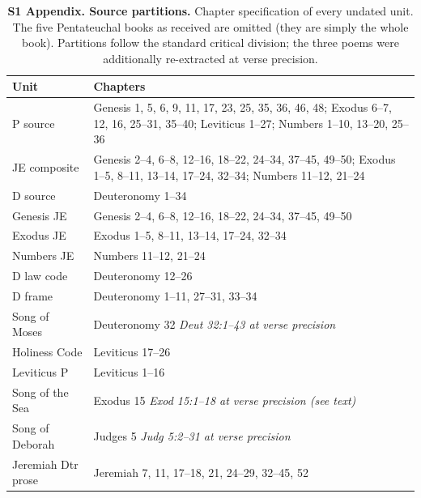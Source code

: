 \begin{table}[!ht]
\centering
\footnotesize
\caption{{\bf S1 Appendix. Source partitions.}  Chapter specification of every undated unit.  The five Pentateuchal books as received are omitted (they are simply the whole book).  Partitions follow the standard critical division; the three poems were additionally re-extracted at verse precision.}
\label{tab:s1}
\begin{tabular}{lp{9.2cm}}
\toprule
\textbf{Unit} & \textbf{Chapters} \\
\midrule
P source & Genesis 1, 5, 6, 9, 11, 17, 23, 25, 35, 36, 46, 48; Exodus 6--7, 12, 16, 25--31, 35--40; Leviticus 1--27; Numbers 1--10, 13--20, 25--36 \\
JE composite & Genesis 2--4, 6--8, 12--16, 18--22, 24--34, 37--45, 49--50; Exodus 1--5, 8--11, 13--14, 17--24, 32--34; Numbers 11--12, 21--24 \\
D source & Deuteronomy 1--34 \\
Genesis JE & Genesis 2--4, 6--8, 12--16, 18--22, 24--34, 37--45, 49--50 \\
Exodus JE & Exodus 1--5, 8--11, 13--14, 17--24, 32--34 \\
Numbers JE & Numbers 11--12, 21--24 \\
D law code & Deuteronomy 12--26 \\
D frame & Deuteronomy 1--11, 27--31, 33--34 \\
Song of Moses & Deuteronomy 32 \newline \textit{Deut 32:1--43 at verse precision} \\
Holiness Code & Leviticus 17--26 \\
Leviticus P & Leviticus 1--16 \\
Song of the Sea & Exodus 15 \newline \textit{Exod 15:1--18 at verse precision (see text)} \\
Song of Deborah & Judges 5 \newline \textit{Judg 5:2--31 at verse precision} \\
Jeremiah Dtr prose & Jeremiah 7, 11, 17--18, 21, 24--29, 32--45, 52 \\
\bottomrule
\end{tabular}
\end{table}
